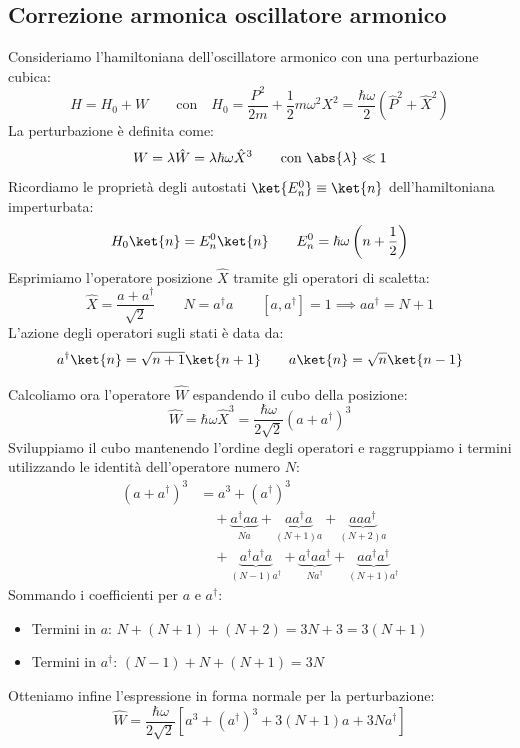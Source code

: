 \subsection{Correzione armonica oscillatore armonico}

Consideriamo l'hamiltoniana dell'oscillatore armonico con una perturbazione cubica:
\[
    H = H_0 + W \qquad \text{con} \quad H_0 = \frac{P^2}{2m} + \frac{1}{2}m\omega^2 X^2 = \frac{\hbar\omega}{2}\left( \hat{P}^2 + \hat{X}^2 \right)
\]
La perturbazione è definita come:
\begin{equation}
    W = \lambda \hat{W} = \lambda \hbar \omega \hat{X}^3 \qquad \text{con } \abs{\lambda} \ll 1
\end{equation}
Ricordiamo le proprietà degli autostati \(\ket{E_n^0}\equiv\ket{n}\) dell'hamiltoniana imperturbata:
\[
    H_0 \ket{n} = E_n^0 \ket{n} \qquad E_n^0 = \hbar\omega\left(n + \frac{1}{2}\right)
\]
Esprimiamo l'operatore posizione \(\hat{X}\) tramite gli operatori di scaletta:
\[
    \hat{X} = \frac{a + a^\dagger}{\sqrt{2}} \qquad N = a^\dagger a \qquad [a, a^\dagger] = 1 \implies a a^\dagger = N + 1
\]
L'azione degli operatori sugli stati è data da:
\[
    a^\dagger \ket{n} = \sqrt{n+1}\ket{n+1} \qquad a \ket{n} = \sqrt{n}\ket{n-1}
\]

Calcoliamo ora l'operatore \(\hat{W}\) espandendo il cubo della posizione:
\[
    \hat{W} = \hbar\omega \hat{X}^3 = \frac{\hbar\omega}{2\sqrt{2}} (a + a^\dagger)^3
\]
Sviluppiamo il cubo mantenendo l'ordine degli operatori e raggruppiamo i termini utilizzando le identità dell'operatore numero \(N\):
\begin{align*}
    (a + a^\dagger)^3 &= a^3 + (a^\dagger)^3 \\
    &\quad + \underbrace{a^\dagger a a}_{Na} + \underbrace{a a^\dagger a}_{(N+1)a} + \underbrace{a a a^\dagger}_{(N+2)a} \\
    &\quad + \underbrace{a^\dagger a^\dagger a}_{(N-1)a^\dagger} + \underbrace{a^\dagger a a^\dagger}_{N a^\dagger} + \underbrace{a a^\dagger a^\dagger}_{(N+1)a^\dagger}
\end{align*}
Sommando i coefficienti per \(a\) e \(a^\dagger\):
\begin{itemize}
    \item Termini in \(a\): \(N + (N+1) + (N+2) = 3N + 3 = 3(N+1)\)
    \item Termini in \(a^\dagger\): \((N-1) + N + (N+1) = 3N\)
\end{itemize}
Otteniamo infine l'espressione in forma normale per la perturbazione:
\begin{equation}
    \hat{W} = \frac{\hbar\omega}{2\sqrt{2}} \left[ a^3 + (a^\dagger)^3 + 3(N+1)a + 3N a^\dagger \right]
\end{equation}

